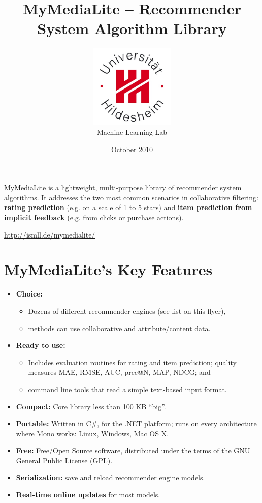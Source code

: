 \documentclass[a4paper, foldmark, 12pt]{leaflet}
\title{MyMediaLite -- Recommender System Algorithm Library}
\author{
	\includegraphics[width=4.0cm]{fig/uni-hildesheim-400x400.jpg}\\
	Machine Learning Lab
}
\date{October 2010}
\begin{document}
\maketitle

MyMediaLite is a lightweight, multi-purpose library
of recommender system algorithms.
It addresses the two most common scenarios in collaborative filtering:
\textbf{rating prediction} (e.g. on a scale of 1 to 5 stars)
and \textbf{item prediction from implicit feedback} (e.g. from clicks or purchase actions).

\begin{center}
	\url{http://ismll.de/mymedialite/}
\end{center}

\newpage

\section{MyMediaLite's Key Features}

\begin{itemize}
	\item \textbf{Choice:}
		\begin{itemize}
			\item Dozens of different recommender engines (see list on this flyer),
			\item methods can use collaborative and attribute/content data.
		\end{itemize}
	\item \textbf{Ready to use:}
		\begin{itemize}
			\item Includes evaluation routines for rating and item prediction;
			      quality measures MAE, RMSE, AUC, prec@N, MAP, NDCG; and
			\item command line tools that read a simple text-based input format.
		\end{itemize}
	\item \textbf{Compact:} Core library less than 100 KB ``big''.
	\item \textbf{Portable:} Written in C\#, for the .NET platform;
	      runs on every architecture where \href{www.mono-project.com}{Mono} works:
	      Linux, Windows, Mac OS X.
	\item \textbf{Free:} Free/Open Source software, distributed under the terms of the
	      GNU General Public License (GPL).
	\item \textbf{Serialization:} save and reload recommender engine models.
	\item \textbf{Real-time online updates} for most models.
\end{itemize}
\end{document}
